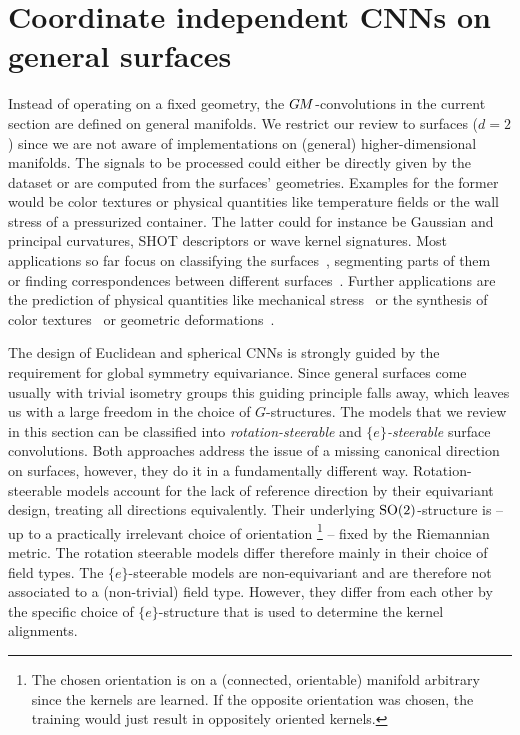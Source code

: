 

\section{Coordinate independent CNNs on general surfaces}
\label{sec:instantiations_mesh}


Instead of operating on a fixed geometry, the $G\mkern-1.4muM$-convolutions in the current section are defined on general manifolds.
We restrict our review to surfaces ($d=2$) since we are not aware of implementations on (general) higher-dimensional manifolds.
The signals to be processed could either be directly given by the dataset or are computed from the surfaces' geometries.
Examples for the former would be color textures or physical quantities like temperature fields or the wall stress of a pressurized container.
The latter could for instance be Gaussian and principal curvatures, SHOT descriptors or wave kernel signatures.
Most applications so far focus on classifying the surfaces~\cite{huang2019texturenet,jin2018learning,Wiersma2020}, segmenting parts of them~\cite{poulenard2018multi,huang2019texturenet,Wiersma2020,Yang2020parallelFrameCNN} or finding correspondences between different surfaces~\cite{masci2015geodesic,boscaini2016learning,schonsheck2018parallel,Wiersma2020,deHaan2020meshCNNs}.
Further applications are the prediction of physical quantities like mechanical stress~\cite{sun2018zernet} or the synthesis of color textures~\cite{turk2001texture,ying2001texture} or geometric deformations~\cite{hertz2020GeomTextureSynthesis}.


The design of Euclidean and spherical CNNs is strongly guided by the requirement for global symmetry equivariance.
Since general surfaces come usually with trivial isometry groups this guiding principle falls away, which leaves us with a large freedom in the choice of $G$-structures.
The models that we review in this section can be classified into \emph{rotation-steerable} and \emph{$\{e\}$-steerable} surface convolutions.
Both approaches address the issue of a missing canonical direction on surfaces, however, they do it in a fundamentally different way.
Rotation-steerable models account for the lack of reference direction by their equivariant design, treating all directions equivalently.
Their underlying $\operatorname{SO}(2)$-structure is -- up to a practically irrelevant choice of orientation%
\footnote{
    The chosen orientation is on a (connected, orientable) manifold arbitrary since the kernels are learned.
    If the opposite orientation was chosen, the training would just result in oppositely oriented kernels.
}
-- fixed by the Riemannian metric.
The rotation steerable models differ therefore mainly in their choice of field types.
The $\{e\}$-steerable models are non-equivariant and are therefore not associated to a (non-trivial) field type.
However, they differ from each other by the specific choice of $\{e\}$-structure that is used to determine the kernel alignments.


